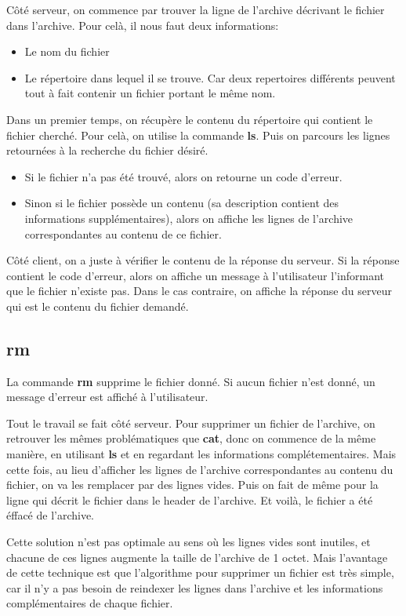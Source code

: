 \documentclass[titlepage]{article}
\begin{document}
	Côté serveur, on commence par trouver la ligne de l'archive décrivant le fichier dans l'archive. Pour celà, il nous faut deux informations:
	\begin{itemize}  
		\item Le nom du fichier   
		\item Le répertoire dans lequel il se trouve. Car deux repertoires différents peuvent tout à fait contenir un fichier portant le même nom.   
	\end{itemize}

	Dans un premier temps, on récupère le contenu du répertoire qui contient le fichier cherché. Pour celà, on utilise la commande \textbf{ls}. Puis on parcours les lignes retournées à la recherche du fichier désiré.

	\begin{itemize}
		\item Si le fichier n'a pas été trouvé, alors on retourne un code d'erreur.
		\item Sinon si le fichier possède un contenu (sa description contient des informations supplémentaires), alors on affiche les lignes de l'archive correspondantes au contenu de ce fichier.
	\end{itemize}

	Côté client, on a juste à vérifier le contenu de la réponse du serveur. Si la réponse contient le code d'erreur, alors on affiche un message à l'utilisateur l'informant que le fichier n'existe pas. Dans le cas contraire, on affiche la réponse du serveur qui est le contenu du fichier demandé.

	\subsection{rm}

	La commande \textbf{rm} supprime le fichier donné. Si aucun fichier n'est donné, un message d'erreur est affiché à l'utilisateur.

	Tout le travail se fait côté serveur. Pour supprimer un fichier de l'archive, on retrouver les mêmes problématiques que \textbf{cat}, donc on commence de la même manière, en utilisant \textbf{ls} et en regardant les informations complétementaires. Mais cette fois, au lieu d'afficher les lignes de l'archive correspondantes au contenu du fichier, on va les remplacer par des lignes vides. Puis on fait de même pour la ligne qui décrit le fichier dans le header de l'archive. Et voilà, le fichier a été éffacé de l'archive.

	Cette solution n'est pas optimale au sens où les lignes vides sont inutiles, et chacune de ces lignes augmente la taille de l'archive de 1 octet. Mais l'avantage de cette technique est que l'algorithme pour supprimer un fichier est très simple, car il n'y a pas besoin de reindexer les lignes dans l'archive et les informations complémentaires de chaque fichier.
\end{document}
